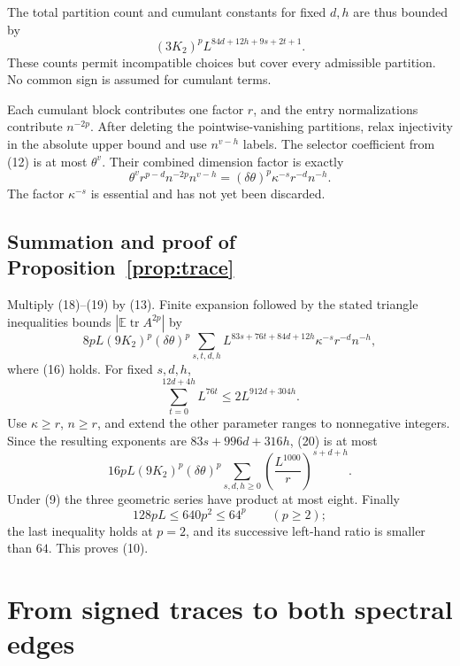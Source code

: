 \documentclass[11pt]{article}
\theoremstyle{definition}
\newcommand{\E}{\mathbb E}
\DeclareMathOperator{\tr}{tr}
\begin{document}
The total partition count and cumulant constants for fixed \(d,h\)
are thus bounded by
\[
                         (3K_2)^p L^{84d+12h+9s+2t+1}.           \tag{18}
\]
These counts permit incompatible choices but cover every admissible
partition. No common sign is assumed for cumulant terms.

Each cumulant block contributes one factor \(r\), and the entry
normalizations contribute \(n^{-2p}\). After deleting the
pointwise-vanishing partitions, relax injectivity in the absolute
upper bound and use \(n^{v-h}\) labels. The selector coefficient
from (12) is at most \(\theta^v\). Their combined dimension factor
is exactly
\[
 \theta^v r^{p-d}n^{-2p}n^{v-h}
            =(\delta\theta)^p\kappa^{-s}r^{-d}n^{-h}.             \tag{19}
\]
The factor \(\kappa^{-s}\) is essential and has not yet been discarded.

\subsection{Summation and proof of Proposition~\ref{prop:trace}}

Multiply (18)--(19) by (13). Finite expansion followed by the stated
triangle inequalities bounds \(|\E\tr A^{2p}|\) by
\[
 8pL(9K_2)^p(\delta\theta)^p
  \sum_{s,t,d,h}L^{83s+76t+84d+12h}\kappa^{-s}r^{-d}n^{-h},       \tag{20}
\]
where (16) holds. For fixed \(s,d,h\),
\[
 \sum_{t=0}^{12d+4h}L^{76t}\le2L^{912d+304h}.
\]
Use \(\kappa\ge r\), \(n\ge r\), and extend the other parameter
ranges to nonnegative integers. Since the resulting exponents
are \(83s+996d+316h\), (20) is at most
\[
 16pL(9K_2)^p(\delta\theta)^p
          \sum_{s,d,h\ge0}\left(\frac{L^{1000}}r\right)^{s+d+h}.
\]
Under (9) the three geometric series have product at most eight.
Finally
\[
 128pL\le640p^2\le64^p\qquad(p\ge2);
\]
the last inequality holds at \(p=2\), and its successive left-hand
ratio is smaller than \(64\). This proves (10).

\section{From signed traces to both spectral edges}
\end{document}
